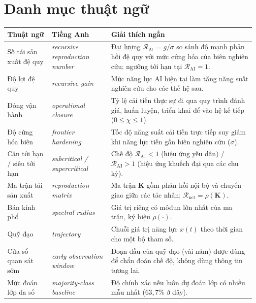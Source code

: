 \documentclass[12pt,a4paper,openany]{report}
\numberwithin{equation}{chapter}   %
\theoremstyle{definition}
\newcommand{\RAI}{\mathcal{R}_{\mathrm{AI}}}
\newcommand{\Rnet}{\mathcal{R}_{\mathrm{net}}}
\newcommand{\en}[1]{\textit{#1}}   %
\begin{document}
\chapter*{Danh mục thuật ngữ}
\begin{longtable}{@{}>{\raggedright\arraybackslash}p{3.4cm}>{\raggedright\arraybackslash}p{3.6cm}>{\raggedright\arraybackslash}p{7cm}@{}}
\toprule
\textbf{Thuật ngữ} & \textbf{Tiếng Anh} & \textbf{Giải thích ngắn}\\
\midrule
\endhead
Số tái sản xuất đệ quy & \en{recursive reproduction number} & Đại lượng $\RAI=g/\sigma$ so sánh độ mạnh phản hồi đệ quy với mức cứng hóa của biên nghiên cứu; ngưỡng tới hạn tại $\RAI=1$.\\
Độ lợi đệ quy & \en{recursive gain} & Mức năng lực AI hiện tại làm tăng năng suất nghiên cứu cho các thế hệ sau.\\
Đóng vận hành & \en{operational closure} & Tỷ lệ cải tiến thực sự đi qua quy trình đánh giá, huấn luyện, triển khai để vào hệ kế tiếp ($0\le\chi\le1$).\\
Độ cứng hóa biên & \en{frontier hardening} & Tốc độ năng suất cải tiến trực tiếp suy giảm khi năng lực tiến gần biên nghiên cứu ($\sigma$).\\
Cận tới hạn / siêu tới hạn & \en{subcritical / supercritical} & Chế độ $\RAI<1$ (hiệu ứng yếu dần) / $\RAI>1$ (hiệu ứng khuếch đại qua các chu kỳ).\\
Ma trận tái sản xuất & \en{reproduction matrix} & Ma trận $\mathbf{K}$ gồm phản hồi nội bộ và chuyển giao giữa các tác nhân; $\Rnet=\rho(\mathbf{K})$.\\
Bán kính phổ & \en{spectral radius} & Giá trị riêng có môđun lớn nhất của ma trận, ký hiệu $\rho(\cdot)$.\\
Quỹ đạo & \en{trajectory} & Chuỗi giá trị năng lực $x(t)$ theo thời gian cho một bộ tham số.\\
Cửa sổ quan sát sớm & \en{early observation window} & Đoạn đầu của quỹ đạo (vài năm) được dùng để chẩn đoán chế độ, không dùng thông tin tương lai.\\
Mức đoán lớp đa số & \en{majority-class baseline} & Độ chính xác nếu luôn dự đoán lớp có nhiều mẫu nhất ($63{,}7\%$ ở đây).\\
\bottomrule
\end{longtable}

\clearpage
{}
\setcounter{page}{1}
\end{document}
